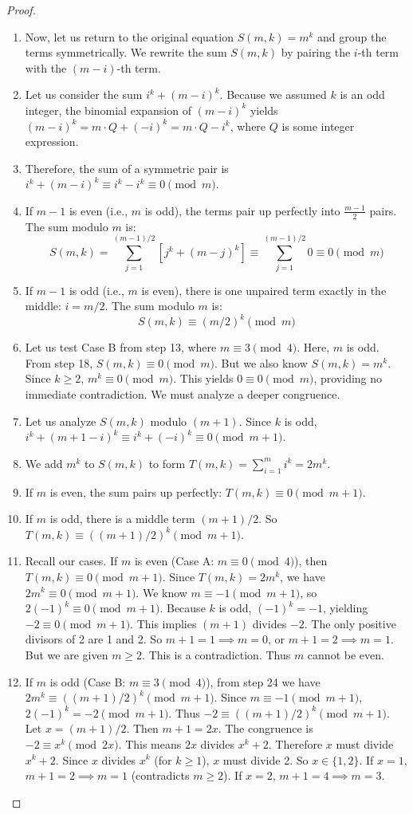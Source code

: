 \documentclass[11pt,a4paper]{article}
\begin{document}
\begin{proof}
\begin{enumerate}
    \item Now, let us return to the original equation $S(m, k) = m^k$ and group the terms symmetrically. We rewrite the sum $S(m, k)$ by pairing the $i$-th term with the $(m-i)$-th term.
    \item Let us consider the sum $i^k + (m-i)^k$. Because we assumed $k$ is an odd integer, the binomial expansion of $(m-i)^k$ yields $(m-i)^k = m \cdot Q + (-i)^k = m \cdot Q - i^k$, where $Q$ is some integer expression.
    \item Therefore, the sum of a symmetric pair is $i^k + (m-i)^k \equiv i^k - i^k \equiv 0 \pmod m$.
    \item If $m-1$ is even (i.e., $m$ is odd), the terms pair up perfectly into $\frac{m-1}{2}$ pairs. The sum modulo $m$ is:
    $$S(m, k) = \sum_{j=1}^{(m-1)/2} \left[ j^k + (m-j)^k \right] \equiv \sum_{j=1}^{(m-1)/2} 0 \equiv 0 \pmod m$$
    \item If $m-1$ is odd (i.e., $m$ is even), there is one unpaired term exactly in the middle: $i = m/2$. The sum modulo $m$ is:
    $$S(m, k) \equiv (m/2)^k \pmod m$$
    \item Let us test Case B from step 13, where $m \equiv 3 \pmod 4$. Here, $m$ is odd. From step 18, $S(m, k) \equiv 0 \pmod m$. But we also know $S(m, k) = m^k$. Since $k \ge 2$, $m^k \equiv 0 \pmod m$. This yields $0 \equiv 0 \pmod m$, providing no immediate contradiction. We must analyze a deeper congruence.
    \item Let us analyze $S(m, k)$ modulo $(m+1)$. Since $k$ is odd, $i^k + (m+1-i)^k \equiv i^k + (-i)^k \equiv 0 \pmod{m+1}$.
    \item We add $m^k$ to $S(m, k)$ to form $T(m, k) = \sum_{i=1}^m i^k = 2m^k$.
    \item If $m$ is even, the sum pairs up perfectly: $T(m, k) \equiv 0 \pmod{m+1}$.
    \item If $m$ is odd, there is a middle term $(m+1)/2$. So $T(m, k) \equiv ((m+1)/2)^k \pmod{m+1}$.
    \item Recall our cases. If $m$ is even (Case A: $m \equiv 0 \pmod 4$), then $T(m, k) \equiv 0 \pmod{m+1}$. Since $T(m, k) = 2m^k$, we have $2m^k \equiv 0 \pmod{m+1}$. We know $m \equiv -1 \pmod{m+1}$, so $2(-1)^k \equiv 0 \pmod{m+1}$. Because $k$ is odd, $(-1)^k = -1$, yielding $-2 \equiv 0 \pmod{m+1}$. This implies $(m+1)$ divides $-2$. The only positive divisors of 2 are 1 and 2. So $m+1=1 \implies m=0$, or $m+1=2 \implies m=1$. But we are given $m \ge 2$. This is a contradiction. Thus $m$ cannot be even.
    \item If $m$ is odd (Case B: $m \equiv 3 \pmod 4$), from step 24 we have $2m^k \equiv ((m+1)/2)^k \pmod{m+1}$. Since $m \equiv -1 \pmod{m+1}$, $2(-1)^k = -2 \pmod{m+1}$. Thus $-2 \equiv ((m+1)/2)^k \pmod{m+1}$. Let $x = (m+1)/2$. Then $m+1 = 2x$. The congruence is $-2 \equiv x^k \pmod{2x}$. This means $2x$ divides $x^k + 2$. Therefore $x$ must divide $x^k + 2$. Since $x$ divides $x^k$ (for $k \ge 1$), $x$ must divide 2. So $x \in \{1, 2\}$. If $x=1$, $m+1=2 \implies m=1$ (contradicts $m \ge 2$). If $x=2$, $m+1=4 \implies m=3$.

\end{enumerate}
\end{proof}
\end{document}
